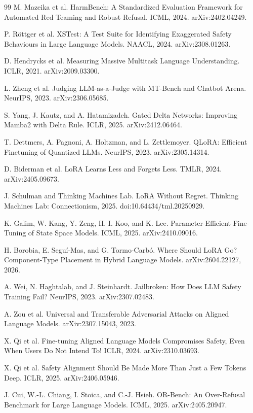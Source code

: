 \documentclass{article}
\begin{document}
\begin{thebibliography}{99}
 M. Mazeika et al. HarmBench: A Standardized Evaluation Framework for Automated Red Teaming and Robust Refusal. ICML, 2024. arXiv:2402.04249.

 P. Röttger et al. XSTest: A Test Suite for Identifying Exaggerated Safety Behaviours in Large Language Models. NAACL, 2024. arXiv:2308.01263.

 D. Hendrycks et al. Measuring Massive Multitask Language Understanding. ICLR, 2021. arXiv:2009.03300.

 L. Zheng et al. Judging LLM-as-a-Judge with MT-Bench and Chatbot Arena. NeurIPS, 2023. arXiv:2306.05685.

 S. Yang, J. Kautz, and A. Hatamizadeh. Gated Delta Networks: Improving Mamba2 with Delta Rule. ICLR, 2025. arXiv:2412.06464.

 T. Dettmers, A. Pagnoni, A. Holtzman, and L. Zettlemoyer. QLoRA: Efficient Finetuning of Quantized LLMs. NeurIPS, 2023. arXiv:2305.14314.

 D. Biderman et al. LoRA Learns Less and Forgets Less. TMLR, 2024. arXiv:2405.09673.

 J. Schulman and Thinking Machines Lab. LoRA Without Regret. Thinking Machines Lab: Connectionism, 2025. doi:10.64434/tml.20250929.

 K. Galim, W. Kang, Y. Zeng, H. I. Koo, and K. Lee. Parameter-Efficient Fine-Tuning of State Space Models. ICML, 2025. arXiv:2410.09016.

 H. Borobia, E. Seguí-Mas, and G. Tormo-Carbó. Where Should LoRA Go? Component-Type Placement in Hybrid Language Models. arXiv:2604.22127, 2026.

 A. Wei, N. Haghtalab, and J. Steinhardt. Jailbroken: How Does LLM Safety Training Fail? NeurIPS, 2023. arXiv:2307.02483.

 A. Zou et al. Universal and Transferable Adversarial Attacks on Aligned Language Models. arXiv:2307.15043, 2023.

 X. Qi et al. Fine-tuning Aligned Language Models Compromises Safety, Even When Users Do Not Intend To! ICLR, 2024. arXiv:2310.03693.

 X. Qi et al. Safety Alignment Should Be Made More Than Just a Few Tokens Deep. ICLR, 2025. arXiv:2406.05946.

 J. Cui, W.-L. Chiang, I. Stoica, and C.-J. Hsieh. OR-Bench: An Over-Refusal Benchmark for Large Language Models. ICML, 2025. arXiv:2405.20947.


\end{thebibliography}
\end{document}
